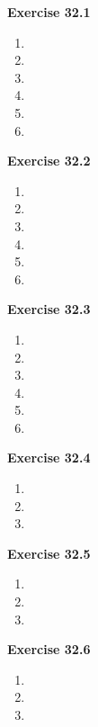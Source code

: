 




\textbf{Exercise 32.1}
\begin{enumerate}
    \item 
    \item 
    \item 
    \item 
    \item 
    \item 
\end{enumerate}

\textbf{Exercise 32.2}
\begin{enumerate}
    \item 
    \item 
    \item 
    \item 
    \item 
    \item 
\end{enumerate}

\textbf{Exercise 32.3}
\begin{enumerate}
    \item 
    \item 
    \item 
    \item 
    \item 
    \item 
\end{enumerate}

\textbf{Exercise 32.4}
\begin{enumerate}
    \item 
    \item 
    \item 
\end{enumerate}

\textbf{Exercise 32.5}
\begin{enumerate}
    \item 
    \item 
    \item 
\end{enumerate}

\textbf{Exercise 32.6}
\begin{enumerate}
    \item 
    \item 
    \item 
\end{enumerate}

